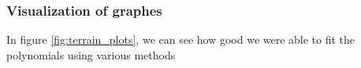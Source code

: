\subsubsection{Visualization of graphes}
In figure \eqref{fig:terrain_plots}, we can see how good we were able to fit the polynomials using various methods


\begin{figure} [H]%
	\centering
	\\
	

\end{figure}
